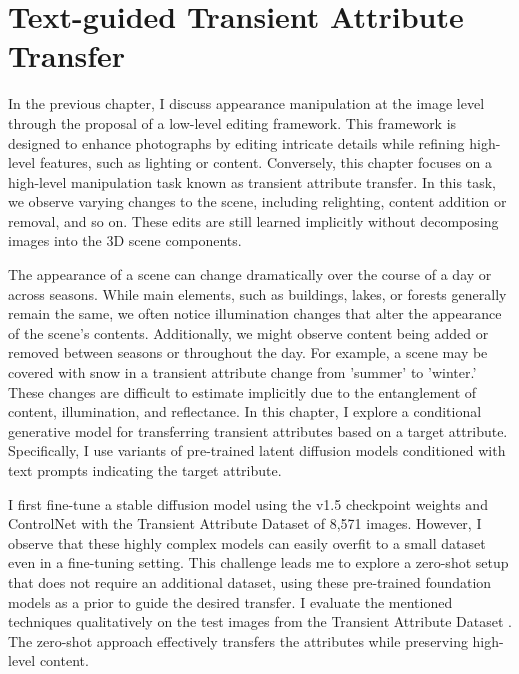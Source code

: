 \chapter{Text-guided Transient Attribute Transfer}\label{zero-shot}

In the previous chapter, I discuss appearance manipulation at the image level through the proposal of a low-level editing framework. This framework is designed to enhance photographs by editing intricate details while refining high-level features, such as lighting or content. Conversely, this chapter focuses on a high-level manipulation task known as transient attribute transfer. In this task, we observe varying changes to the scene, including relighting, content addition or removal, and so on. These edits are still learned implicitly without decomposing images into the 3D scene components.

The appearance of a scene can change dramatically over the course of a day or across seasons. While main elements, such as buildings, lakes, or forests generally remain the same, we often notice illumination changes that alter the appearance of the scene’s contents. Additionally, we might observe content being added or removed between seasons or throughout the day. For example, a scene may be covered with snow in a transient attribute change from 'summer' to 'winter.' These changes are difficult to estimate implicitly due to the entanglement of content, illumination, and reflectance. In this chapter, I explore a conditional generative model for transferring transient attributes based on a target attribute. Specifically, I use variants of pre-trained latent diffusion models conditioned with text prompts indicating the target attribute.

I first fine-tune a stable diffusion model using the v1.5 checkpoint weights \cite{rombach2022high} and ControlNet \cite{zhang2023adding} with the Transient Attribute Dataset \cite{laffont2014transient} of 8,571 images. However, I observe that these highly complex models can easily overfit to a small dataset even in a fine-tuning setting. This challenge leads me to explore a zero-shot setup that does not require an additional dataset, using these pre-trained foundation models as a prior to guide the desired transfer. I evaluate the mentioned techniques qualitatively on the test images from the Transient Attribute Dataset\cite{laffont2014transient} . The zero-shot approach effectively transfers the attributes while preserving high-level content.



